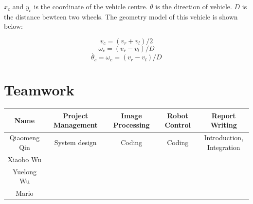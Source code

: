 $x_c$ and $y_c$ is the coordinate of the vehicle centre. $\theta$ is the direction of vehicle. $D$ is the distance bewteen two wheels. The geometry model of this vehicle is shown below:

$$ v_c = (v_r+v_l)/2 $$
$$ \omega_c = ( v_r - v_l ) / D $$
$$ \dot{\theta_c} = \omega_c = ( v_r - v_l ) / D $$

\section{Teamwork}

\begin{table}[h]\footnotesize
\begin{tabular}{c|cccc}
\hline 
Name&Project Management&Image Processing&Robot Control&Report Writing\\
\hline 
Qiaomeng Qin&System design&Coding&Coding& \makecell[c]{Introduction, \\Integration} \\
Xiaobo Wu&\\
Yuelong Wu&\\
Mario &\\
\hline 
\end{tabular}
\end{table}


